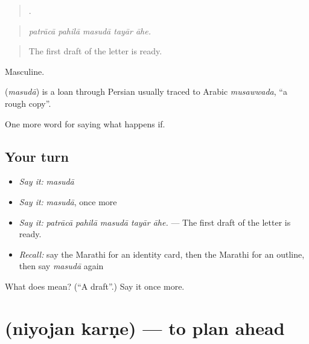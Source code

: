 \begin{quote}
    .
\end{quote}

\begin{quote}
\emph{patrācā pahilā masudā tayār āhe.}
\end{quote}

\begin{quote}
The first draft of the letter is ready.
\end{quote}

Masculine.

\begin{cousinweb}
\textbf{} (\emph{masudā}) is a loan through Persian usually traced to Arabic \emph{musawwada}, \textquotedblleft{}a rough copy\textquotedblright{}.
\end{cousinweb}

\begin{grammarlens}[title={What you've built}]
One more word for saying what happens if.
\end{grammarlens}

\subsection*{Your turn}
\begin{itemize}
\raggedright
  \item \emph{Say it:} \emph{masudā}
  \item \emph{Say it:} \emph{masudā}, once more
  \item \emph{Say it:} \emph{patrācā pahilā masudā tayār āhe.} — The first draft of the letter is ready.
  \item \emph{Recall:} say the Marathi for an identity card, then the Marathi for an outline, then say \emph{masudā} again
\end{itemize}

\begin{tcolorbox}[breakable,colback=teal!4,colframe=teal!35!black,title={Before you move on}]
What does  mean? (\textquotedblleft{}A draft\textquotedblright{}.) Say it once more.
\end{tcolorbox}
\section[\texorpdfstring{\mr{नियोजन} \mr{करणे} (niyojan karṇe)}{नियोजन करणे (niyojan karṇe)}]{  (niyojan karṇe) — to plan ahead}

